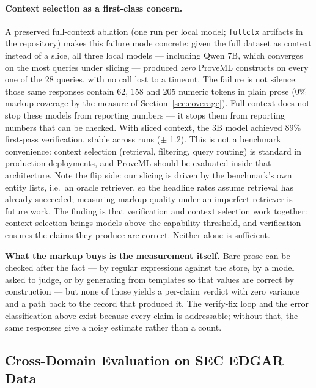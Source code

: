 \documentclass[11pt,a4paper]{article}
\begin{document}
\paragraph{Context selection as a first-class concern.} A preserved full-context ablation (one run per local model; \texttt{fullctx} artifacts in the repository) makes this failure mode concrete: given the full dataset as context instead of a slice, all three local models --- including Qwen 7B, which converges on the most queries under slicing --- produced \textit{zero} ProveML constructs on every one of the 28 queries, with no call lost to a timeout. The failure is not silence: those same responses contain 62, 158 and 205 numeric tokens in plain prose (0\% markup coverage by the measure of Section~\ref{sec:coverage}). Full context does not stop these models from reporting numbers --- it stops them from reporting numbers that can be checked. With sliced context, the 3B model achieved 89\% first-pass verification, stable across runs ($\pm$ 1.2). This is not a benchmark convenience: context selection (retrieval, filtering, query routing) is standard in production deployments, and ProveML should be evaluated inside that architecture. Note the flip side: our slicing is driven by the benchmark's own entity lists, i.e.\ an oracle retriever, so the headline rates assume retrieval has already succeeded; measuring markup quality under an imperfect retriever is future work. The finding is that verification and context selection work together: context selection brings models above the capability threshold, and verification ensures the claims they produce are correct. Neither alone is sufficient.

\textbf{What the markup buys is the measurement itself.} Bare prose can be checked after the fact --- by regular expressions against the store, by a model asked to judge, or by generating from templates so that values are correct by construction --- but none of those yields a per-claim verdict with zero variance and a path back to the record that produced it. The verify-fix loop and the error classification above exist because every claim is addressable; without that, the same responses give a noisy estimate rather than a count.

\subsection{Cross-Domain Evaluation on SEC EDGAR Data}
\label{sec:finance}
\end{document}
